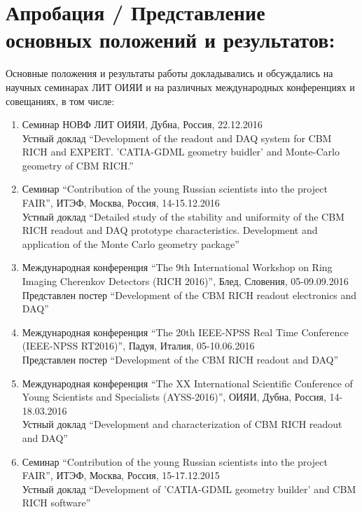 \section*{Апробация / Представление основных положений и результатов:}


Основные положения и результаты работы докладывались и обсуждались на научных семинарах ЛИТ ОИЯИ и на различных международных конференциях и совещаниях, в том числе:

\begin{enumerate}

\item Семинар НОВФ ЛИТ ОИЯИ, Дубна, Россия, 22.12.2016 \\
Устный доклад ``Development of the readout and DAQ system for CBM RICH and EXPERT. 'CATIA-GDML geometry buidler' and Monte-Carlo geometry of CBM RICH.''

\item Семинар ``Contribution of the young Russian scientists into the project FAIR'', ИТЭФ, Москва, Россия, 14-15.12.2016 \\
Устный доклад ``Detailed study of the stability and uniformity of the CBM RICH readout and DAQ prototype characteristics. Development and application of the Monte Carlo geometry package''

\item Международная конференция ``The 9th International Workshop on Ring Imaging Cherenkov Detectors (RICH 2016)'', Блед, Словения, 05-09.09.2016 \\
Представлен постер ``Development of the CBM RICH readout electronics and DAQ''

\item Международная конференция ``The 20th IEEE-NPSS Real Time Conference (IEEE-NPSS RT2016)'', Падуя, Италия, 05-10.06.2016 \\
Представлен постер ``Development of the CBM RICH readout and DAQ''

\item Международная конференция ``The XX International Scientific Conference of Young Scientists and Specialists (AYSS-2016)'', ОИЯИ, Дубна, Россия, 14-18.03.2016 \\
Устный доклад ``Development and characterization of CBM RICH readout and DAQ''

\item Семинар ``Contribution of the young Russian scientists into the project FAIR'', ИТЭФ, Москва, Россия, 15-17.12.2015 \\
Устный доклад ``Development of 'CATIA-GDML geometry builder' and CBM RICH software''


\end{enumerate}

